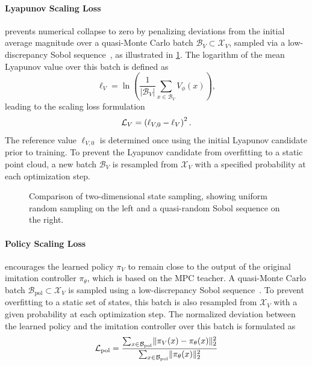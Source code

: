 \paragraph{Lyapunov Scaling Loss} prevents numerical collapse to zero 
by penalizing deviations from the initial average magnitude over a 
quasi-Monte Carlo batch $\mathcal{B}_V \subset \mathcal{X}_V$, 
sampled via a low-discrepancy Sobol sequence~\cite{joeConstructingSobolSequences2008}, as illustrated in \cref{fig:sobol-sampling}.
The logarithm of the mean Lyapunov value over this batch is defined as
\begin{equation}
    \label{eq:mean-lyapunov-log}
    \ell_V = \ln \left( \frac{1}{|\mathcal{B}_V|} \sum_{x \in \mathcal{B}_V} V_\phi(x) \right),
\end{equation}
leading to the scaling loss formulation
\begin{equation}
    \label{eq:scaling-loss}
    \mathcal{L}_V = \left( \ell_{V,0} - \ell_V \right)^2.
\end{equation}
The reference value $\ell_{V,0}$ is determined once using the initial 
Lyapunov candidate prior to training. To prevent the Lyapunov candidate from 
overfitting to a static point cloud, a new batch $\mathcal{B}_V$ is resampled from $\mathcal{X}_V$ 
with a specified probability at each optimization step.
\begin{figure}[htbp]
    \centering
    
    \caption[Sobol sequence illustration]{
        Comparison of two-dimensional state sampling, showing uniform random sampling on the left and 
        a quasi-random Sobol sequence on the right.}
    \label{fig:sobol-sampling}
\end{figure}


\paragraph{Policy Scaling Loss} encourages the learned policy $\pi_V$ to remain close 
to the output of the original imitation controller $\pi_\theta$, which is based on the MPC teacher. 
A quasi-Monte Carlo batch $\mathcal{B}_{\mathrm{pol}} \subset \mathcal{X}_V$ is sampled using a 
low-discrepancy Sobol sequence~\cite{joeConstructingSobolSequences2008}. 
To prevent overfitting to a static set of states, this batch is also resampled from $\mathcal{X}_V$ 
with a given probability at each optimization step. 
The normalized deviation between the learned policy and the imitation controller over this batch is formulated as
\begin{equation}
    \label{eq:policy-scaling-loss}
    \mathcal{L}_{\mathrm{pol}} = \frac{
        \sum_{x \in \mathcal{B}_{\mathrm{pol}}} \lVert \pi_V(x) - \pi_\theta(x) \rVert_2^2
    }{
        \sum_{x \in \mathcal{B}_{\mathrm{pol}}} \lVert \pi_\theta(x) \rVert_2^2
    }
\end{equation}


